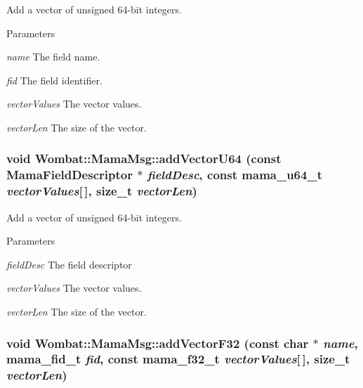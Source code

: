 Add a vector of unsigned 64-\/bit integers. 
\begin{DoxyParams}{Parameters}
\item[{\em name}]The field name. \item[{\em fid}]The field identifier. \item[{\em vectorValues}]The vector values. \item[{\em vectorLen}]The size of the vector. \end{DoxyParams}
\hypertarget{classWombat_1_1MamaMsg_af591a7090ff6c799a08a6d2e35e6915b}{
\subsubsection[{addVectorU64}]{\setlength{\rightskip}{0pt plus 5cm}void Wombat::MamaMsg::addVectorU64 (const {\bf MamaFieldDescriptor} $\ast$ {\em fieldDesc}, \/  const mama\_\-u64\_\-t {\em vectorValues}\mbox{[}$\,$\mbox{]}, \/  size\_\-t {\em vectorLen})}}
\label{classWombat_1_1MamaMsg_af591a7090ff6c799a08a6d2e35e6915b}


Add a vector of unsigned 64-\/bit integers. 
\begin{DoxyParams}{Parameters}
\item[{\em fieldDesc}]The field descriptor \item[{\em vectorValues}]The vector values. \item[{\em vectorLen}]The size of the vector. \end{DoxyParams}
\hypertarget{classWombat_1_1MamaMsg_a72c7a6b15c12e825ce0f775925c74f58}{
\subsubsection[{addVectorF32}]{\setlength{\rightskip}{0pt plus 5cm}void Wombat::MamaMsg::addVectorF32 (const char $\ast$ {\em name}, \/  mama\_\-fid\_\-t {\em fid}, \/  const mama\_\-f32\_\-t {\em vectorValues}\mbox{[}$\,$\mbox{]}, \/  size\_\-t {\em vectorLen})}}
\label{classWombat_1_1MamaMsg_a72c7a6b15c12e825ce0f775925c74f58}


